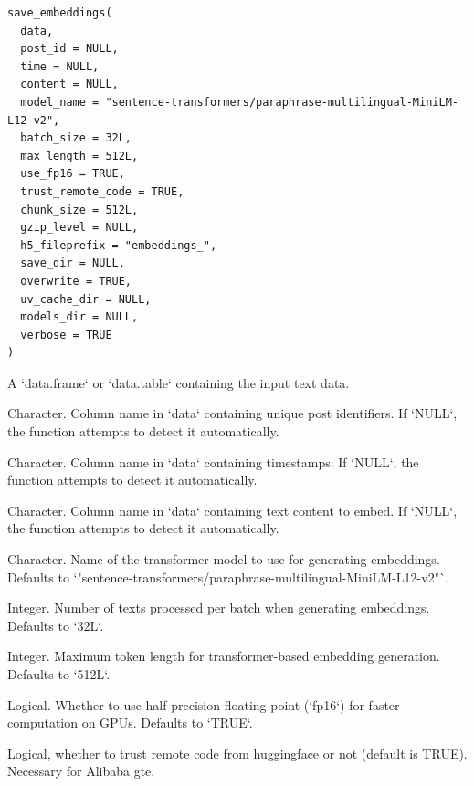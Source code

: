 \documentclass[a4paper]{book}
\begin{document}
%
\begin{Usage}
\begin{verbatim}
save_embeddings(
  data,
  post_id = NULL,
  time = NULL,
  content = NULL,
  model_name = "sentence-transformers/paraphrase-multilingual-MiniLM-L12-v2",
  batch_size = 32L,
  max_length = 512L,
  use_fp16 = TRUE,
  trust_remote_code = TRUE,
  chunk_size = 512L,
  gzip_level = NULL,
  h5_fileprefix = "embeddings_",
  save_dir = NULL,
  overwrite = TRUE,
  uv_cache_dir = NULL,
  models_dir = NULL,
  verbose = TRUE
)
\end{verbatim}
\end{Usage}
%
\begin{Arguments}
\begin{ldescription}
\item[\code{data}] A `data.frame` or `data.table` containing the input text data.

\item[\code{post\_id}] Character. Column name in `data` containing unique post identifiers. If `NULL`, 
the function attempts to detect it automatically.

\item[\code{time}] Character. Column name in `data` containing timestamps. If `NULL`, the function 
attempts to detect it automatically.

\item[\code{content}] Character. Column name in `data` containing text content to embed. If `NULL`, 
the function attempts to detect it automatically.

\item[\code{model\_name}] Character. Name of the transformer model to use for generating embeddings. 
Defaults to `"sentence-transformers/paraphrase-multilingual-MiniLM-L12-v2"`.

\item[\code{batch\_size}] Integer. Number of texts processed per batch when generating embeddings. 
Defaults to `32L`.

\item[\code{max\_length}] Integer. Maximum token length for transformer-based embedding generation. 
Defaults to `512L`.

\item[\code{use\_fp16}] Logical. Whether to use half-precision floating point (`fp16`) for faster 
computation on GPUs. Defaults to `TRUE`.

\item[\code{trust\_remote\_code}] Logical, whether to trust remote code from huggingface or not (default is TRUE). 
Necessary for Alibaba gte.


\end{ldescription}
\end{Arguments}
\end{document}
